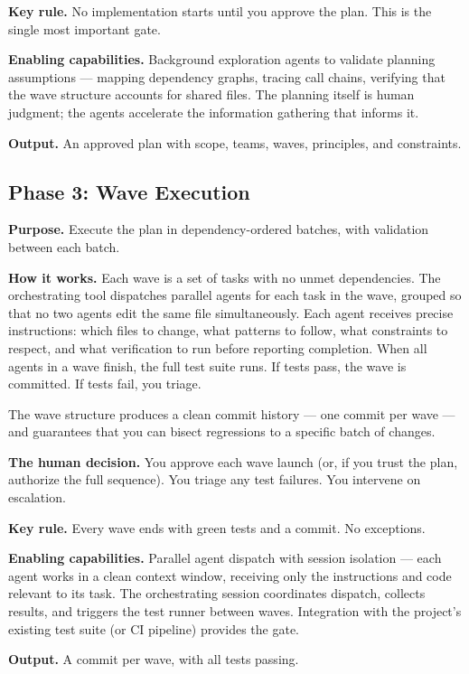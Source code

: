 \documentclass[
  a4paper,
  DIV=11,
  numbers=noendperiod]{scrreprt}
\begin{document}
\textbf{Key rule.} No implementation starts until you approve the plan.
This is the single most important gate.

\textbf{Enabling capabilities.} Background exploration agents to
validate planning assumptions --- mapping dependency graphs, tracing
call chains, verifying that the wave structure accounts for shared
files. The planning itself is human judgment; the agents accelerate the
information gathering that informs it.

\textbf{Output.} An approved plan with scope, teams, waves, principles,
and constraints.

\subsection{Phase 3: Wave Execution}\label{phase-3-wave-execution}

\textbf{Purpose.} Execute the plan in dependency-ordered batches, with
validation between each batch.

\textbf{How it works.} Each wave is a set of tasks with no unmet
dependencies. The orchestrating tool dispatches parallel agents for each
task in the wave, grouped so that no two agents edit the same file
simultaneously. Each agent receives precise instructions: which files to
change, what patterns to follow, what constraints to respect, and what
verification to run before reporting completion. When all agents in a
wave finish, the full test suite runs. If tests pass, the wave is
committed. If tests fail, you triage.

The wave structure produces a clean commit history --- one commit per
wave --- and guarantees that you can bisect regressions to a specific
batch of changes.

\textbf{The human decision.} You approve each wave launch (or, if you
trust the plan, authorize the full sequence). You triage any test
failures. You intervene on escalation.

\textbf{Key rule.} Every wave ends with green tests and a commit. No
exceptions.

\textbf{Enabling capabilities.} Parallel agent dispatch with session
isolation --- each agent works in a clean context window, receiving only
the instructions and code relevant to its task. The orchestrating
session coordinates dispatch, collects results, and triggers the test
runner between waves. Integration with the project's existing test suite
(or CI pipeline) provides the gate.

\textbf{Output.} A commit per wave, with all tests passing.
\end{document}
